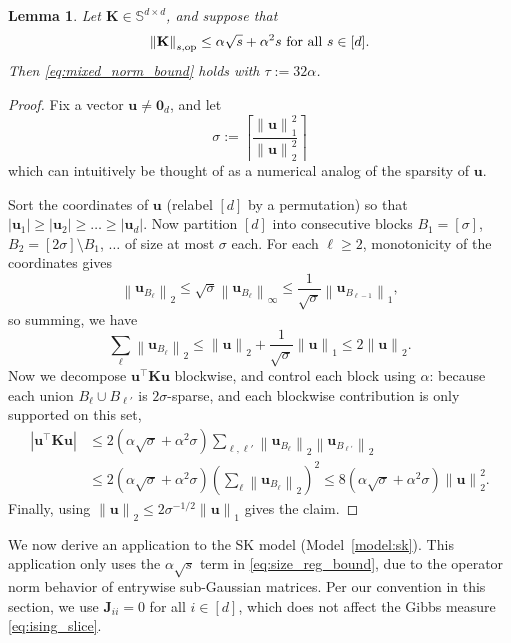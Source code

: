 \documentclass[11pt]{article}
\newtheorem{lemma}{Lemma}
\newcommand{\defeq}{:=}
\newcommand{\norm}[1]{\left\lVert#1\right\rVert}
\newcommand{\1}{\mathbf{1}}
\newcommand{\0}{\mathbf{0}}
\newcommand{\Par}[1]{\left(#1\right)}
\newcommand{\Abs}[1]{\left|#1\right|}
\newcommand{\Sym}{\mathbb{S}}
\newcommand{\mj}{{\mathbf{J}}}
\newcommand{\mk}{{\mathbf{K}}}
\newcommand{\normkop}[2]{{\left\lVert#1\right\rVert_{#2, \textup{op}}}}
\newcommand{\vu}{{\mathbf{u}}}
\begin{document}
\begin{lemma}\label{lem:comparison_mixednorm}
Let $\mk \in \Sym^{d \times d}$, and suppose that
\begin{equation}\label{eq:size_reg_bound}\normkop{\mk}{s} \le \alpha \sqrt{s} + \alpha^2 s \text{ for all } s \in [d].\end{equation}
Then \eqref{eq:mixed_norm_bound} holds with $\tau \defeq 32\alpha$.
\end{lemma}
\begin{proof}
Fix a vector $\vu \neq \0_d$, and let
\[\sigma \defeq \left\lceil\frac{\norm{\vu}_1^2}{\norm{\vu}_2^2}\right\rceil\]
which can intuitively be thought of as a numerical analog of the sparsity of $\vu$. 

Sort the coordinates of $\vu$ (relabel $[d]$ by a permutation) so that $|\vu_1| \ge |\vu_2| \ge \ldots \ge |\vu_d|$. Now partition $[d]$ into consecutive blocks $B_1 = [\sigma]$, $B_2 = [2\sigma] \setminus B_1$, $\ldots$ of size at most $\sigma$ each. For each $\ell \ge 2$, monotonicity of the coordinates gives
\[\norm{\vu_{B_\ell}}_2 \le \sqrt{\sigma} \norm{\vu_{B_\ell}}_\infty \le \frac 1 {\sqrt \sigma} \norm{\vu_{B_{\ell - 1}}}_1, \]
so summing, we have
\[\sum_\ell \norm{\vu_{B_\ell}}_2 \le \norm{\vu}_2 + \frac 1 {\sqrt \sigma}\norm{\vu}_1 \le 2\norm{\vu}_2.\]
Now we decompose $\vu^\top \mk \vu$ blockwise, and control each block using $\alpha$: because each union $B_\ell \cup B_{\ell'}$ is $2\sigma$-sparse, and each blockwise contribution is only supported on this set,
\begin{equation}\label{eq:shell_quadform}\begin{aligned}\Abs{\vu^\top \mk \vu} &\le 2(\alpha \sqrt \sigma + \alpha^2 \sigma)\sum_{\ell, \ell'} \norm{\vu_{B_\ell}}_2\norm{\vu_{B_{\ell'}}}_2 \\
&\le 2(\alpha \sqrt \sigma + \alpha^2 \sigma) \Par{\sum_\ell \norm{\vu_{B_\ell}}_2}^2 \le 8(\alpha \sqrt \sigma + \alpha^2 \sigma) \norm{\vu}_2^2.
\end{aligned}\end{equation}
Finally, using $\norm{\vu}_2 \le 2\sigma^{-1/2} \norm{\vu}_1$ gives the claim.
\end{proof}

We now derive an application to the SK model (Model~\ref{model:sk}). This application only uses the $\alpha \sqrt{s}$ term in \eqref{eq:size_reg_bound}, due to the operator norm behavior of entrywise sub-Gaussian matrices.
Per our convention in this section, we use $\mj_{ii} = 0$ for all $i \in [d]$, which does not affect the Gibbs measure \eqref{eq:ising_slice}.
\end{document}

